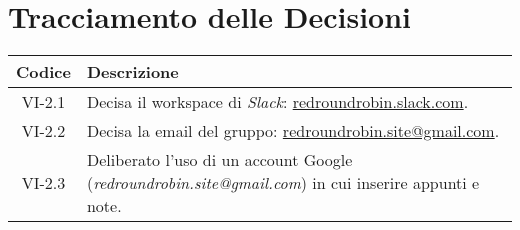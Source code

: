 \section*{Tracciamento delle Decisioni}

\begin{center}
	\begin{longtable}{|c|p{14.5cm}|}
	\hline
	\rowcolor{lighter-grayer}
	\textbf{Codice} & \textbf{Descrizione} \\
	\hline
	\endfirsthead

	\hline
	VI-2.1 & Decisa il workspace di \textit{Slack}: \href{http://redroundrobin.slack.com}{redroundrobin.slack.com}. \\
	\hline
	VI-2.2 & Decisa la email del gruppo: \href{mailto:redroundrobin.site@gmail.com}{redroundrobin.site@gmail.com}. \\
	\hline
	VI-2.3 & Deliberato l'uso di un account Google (\textit{redroundrobin.site@gmail.com}) in cui inserire appunti e note. \\
	\hline

	\end{longtable}
\end{center}
